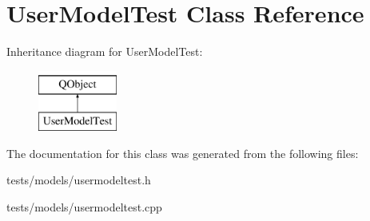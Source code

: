 \hypertarget{classUserModelTest}{}\section{User\+Model\+Test Class Reference}
\label{classUserModelTest}
Inheritance diagram for User\+Model\+Test\+:\begin{figure}[H]
\begin{center}
\leavevmode
\includegraphics[height=2.000000cm]{de/d37/classUserModelTest}
\end{center}
\end{figure}


The documentation for this class was generated from the following files\+:\begin{DoxyCompactItemize}
\item 
tests/models/usermodeltest.\+h\item 
tests/models/usermodeltest.\+cpp\end{DoxyCompactItemize}
